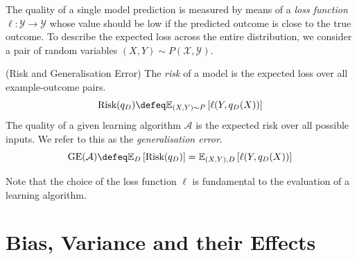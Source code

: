 \documentclass[
    a4paper, %
	fontsize=10pt, %
	twoside=false, %
]{kaobook}
\begin{document}

%
The quality of a single model prediction is measured by means of a \textit{loss function} $\ell: \mathcal{Y} \to \mathcal{Y}$ whose value should be low if the predicted outcome is close to the true outcome. 
To describe the expected loss across the entire distribution, we consider a pair of random variables $(X,Y) \sim P(\mathcal{X}, \mathcal{Y})$. 

\begin{definition} (Risk and Generalisation Error)
The \textit{risk} of a model is the expected loss over all example-outcome pairs.
$$
\text{Risk}(q_{D}) \defeq \mathbb{E}_{(X,Y)\sim P}\left[ \ell(Y, q_{D}(X)) \right] 
$$
%
The quality of a given learning algorithm $\mathcal{A}$ is the expected risk over all possible inputs. We refer to this as the \textit{generalisation error}. 
$$
\text{GE}(\mathcal{A}) \defeq \mathbb{E}_{D}\left[ \text{Risk}(q_{D}) \right]  = \mathbb{E}_{(X,Y), D}\left[ \ell(Y, q_{D}(X)) \right] 
$$
\end{definition}
Note that the choice of the loss function $\ell$ is fundamental to the evaluation of a learning algorithm.

\section{Bias, Variance and their Effects}
 \label{sec:bias-variance-effects}
\end{document}
